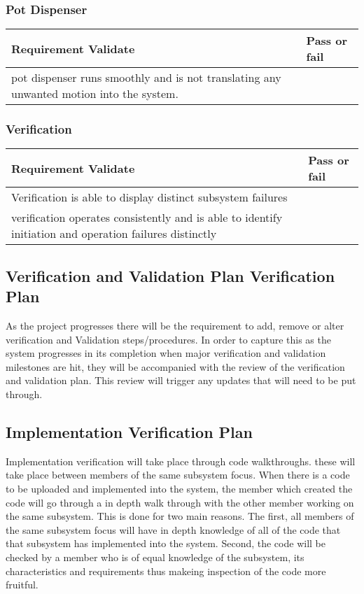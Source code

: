 \documentclass[12pt, titlepage]{article}
\begin{document}
\subsubsection{Pot Dispenser}
\begin{center}
 \begin{tabular}{ |m{10cm}|m{3cm}| } 
   \hline
   \textbf{Requirement Validate} & \textbf{Pass or fail } \\ 
   \hline
   pot dispenser runs smoothly and is not translating any unwanted motion into the system. & \\
  
   \hline
 \end{tabular}
\end{center}

\subsubsection{Verification}
\begin{center}
 \begin{tabular}{ |m{10cm}|m{3cm}| } 
   \hline
   \textbf{Requirement Validate} & \textbf{Pass or fail } \\ 
   \hline
    Verification is able to display distinct subsystem failures& \\
    verification operates consistently and is able to identify initiation and operation failures distinctly & \\

   \hline
 \end{tabular}
\end{center}


\subsection{Verification and Validation Plan Verification Plan}
As the project progresses there will be the requirement to add, remove or alter verification and 
Validation steps/procedures. In order to capture this as the system progresses in its completion 
when major verification and validation milestones are hit, they will be accompanied with the
review of the verification and validation plan. This review will trigger any updates that will
need to be put through.

\subsection{Implementation Verification Plan}
Implementation verification will take place through code walkthroughs. these will take place between
 members of the same subsystem focus. When there is a code to be uploaded and implemented into the system,
  the member which created the code will go through a in depth walk through with the other member working
   on the same subsystem. This is done for two main reasons. The first, all members of the same subsystem 
   focus will have in depth knowledge of all of the code that that subsystem has implemented into the system.
    Second, the code will be checked by a member who is of equal knowledge of the subsystem, its 
    characteristics and requirements thus makeing inspection of the code more fruitful.
\end{document}
